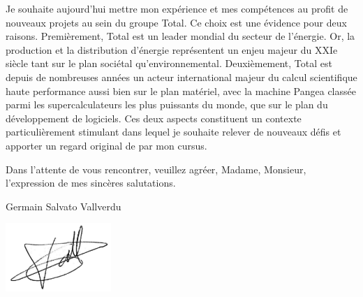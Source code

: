 \documentclass[11pt,a4paper,ragged2e,academicons]{alta_letter}
\begin{document}
Je souhaite aujourd'hui mettre mon expérience et mes compétences au profit de nouveaux projets au sein du groupe Total. Ce choix est une évidence pour deux raisons. Premièrement, Total est un leader mondial du secteur de l'énergie. Or, la production et la distribution d'énergie représentent un enjeu majeur du XXIe siècle tant sur le plan sociétal qu'environnemental. Deuxièmement, Total est depuis de nombreuses années un acteur international majeur du calcul scientifique haute performance aussi bien sur le plan matériel, avec la machine Pangea classée parmi les supercalculateurs les plus puissants du monde, que sur le plan du développement de logiciels. Ces deux aspects constituent un contexte particulièrement stimulant dans lequel je souhaite relever de nouveaux défis et apporter un regard original de par mon cursus.

Dans l'attente de vous rencontrer, veuillez agréer, Madame, Monsieur, l'expression de mes sincères salutations.

\bigskip

\hspace{.6\textwidth}Germain Salvato Vallverdu

\hspace{.6\textwidth}\includegraphics[width=4cm]{maSignature}
\end{document}
